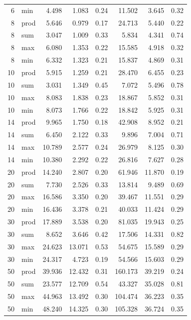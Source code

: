 \documentclass[11pt]{article}
\begin{document}
\begin{table}[H]
\begin{tabular}{@{}rlrrrrrr@{}}
        6 & min & 4.498 & 1.083 & 0.24 & 11.502 & 3.645 & 0.32 \\
        8 & prod & 5.646 & 0.979 & 0.17 & 24.713 & 5.440 & 0.22 \\
        8 & sum & 3.047 & 1.009 & 0.33 & 5.834 & 4.341 & 0.74 \\
        8 & max & 6.080 & 1.353 & 0.22 & 15.585 & 4.918 & 0.32 \\
        8 & min & 6.332 & 1.323 & 0.21 & 15.837 & 4.869 & 0.31 \\
        10 & prod & 5.915 & 1.259 & 0.21 & 28.470 & 6.455 & 0.23 \\
        10 & sum & 3.031 & 1.349 & 0.45 & 7.072 & 5.496 & 0.78 \\
        10 & max & 8.083 & 1.838 & 0.23 & 18.867 & 5.852 & 0.31 \\
        10 & min & 8.073 & 1.766 & 0.22 & 18.842 & 5.925 & 0.31 \\
        14 & prod & 9.965 & 1.750 & 0.18 & 42.908 & 8.952 & 0.21 \\
        14 & sum & 6.450 & 2.122 & 0.33 & 9.896 & 7.004 & 0.71 \\
        14 & max & 10.789 & 2.577 & 0.24 & 26.979 & 8.125 & 0.30 \\
        14 & min & 10.380 & 2.292 & 0.22 & 26.816 & 7.627 & 0.28 \\
        20 & prod & 14.240 & 2.807 & 0.20 & 61.946 & 11.870 & 0.19 \\
        20 & sum & 7.730 & 2.526 & 0.33 & 13.814 & 9.489 & 0.69 \\
        20 & max & 16.586 & 3.350 & 0.20 & 39.467 & 11.551 & 0.29 \\
        20 & min & 16.436 & 3.378 & 0.21 & 40.033 & 11.424 & 0.29 \\
        30 & prod & 17.889 & 3.538 & 0.20 & 81.035 & 19.943 & 0.25 \\
        30 & sum & 8.652 & 3.646 & 0.42 & 17.506 & 14.331 & 0.82 \\
        30 & max & 24.623 & 13.071 & 0.53 & 54.675 & 15.589 & 0.29 \\
        30 & min & 24.317 & 4.723 & 0.19 & 54.566 & 15.603 & 0.29 \\
        50 & prod & 39.936 & 12.432 & 0.31 & 160.173 & 39.219 & 0.24 \\
        50 & sum & 23.577 & 12.709 & 0.54 & 43.327 & 35.028 & 0.81 \\
        50 & max & 44.963 & 13.492 & 0.30 & 104.474 & 36.223 & 0.35 \\
        50 & min & 48.240 & 14.325 & 0.30 & 105.328 & 36.724 & 0.35 \\
\bottomrule
\end{tabular}
\end{table}
\end{document}
